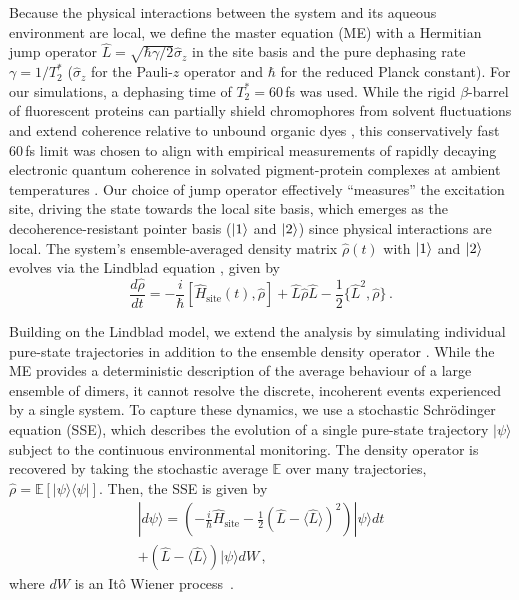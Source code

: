 \documentclass[journal=jpclcd, manuscript=letter, layout=twocolumn, doi=true]{achemso}
\begin{document}
Because the physical interactions between the system and its aqueous environment are local, we define the master equation (ME) with a Hermitian jump operator $\hat{L} = \sqrt{\hbar \gamma / 2} \hat{\sigma}_z$ in the site basis and the pure dephasing rate $\gamma = 1/T_2^*$ ($\hat{\sigma}_z$ for the Pauli-$z$ operator and $\hbar$ for the reduced Planck constant). For our simulations, a dephasing time of $T_2^* = 60$\,fs was used. While the rigid $\beta$-barrel of fluorescent proteins can partially shield chromophores from solvent fluctuations and extend coherence relative to unbound organic dyes \cite{kim2019venusa206}, this conservatively fast $60$\,fs limit was chosen to align with empirical measurements of rapidly decaying electronic quantum coherence in solvated pigment-protein complexes at ambient temperatures \cite{duan2017nature}. Our choice of jump operator effectively ``measures'' the excitation site, driving the state towards the local site basis, which emerges as the decoherence-resistant pointer basis ($\ket{1}$ and $\ket{2}$) since physical interactions are local. The system's ensemble-averaged density matrix $\hat{\rho}(t)$ with $\ket{1}$ and $\ket{2}$ evolves via the Lindblad equation \cite{manzano2020short}, given by
\begin{equation}
    \frac{d\hat{\rho}}{dt}=-\frac{i}{\hbar}[\hat H_{\text{site}}(t),\hat\rho] + \hat{L} \hat\rho \hat{L} - \frac{1}{2} \{\hat{L}^2, \hat\rho\}\,.
    \label{eq:ME01}
\end{equation}

Building on the Lindblad model, we extend the analysis by simulating individual pure-state trajectories in addition to the ensemble density operator \cite{abrahams2025excitonic}. While the ME provides a deterministic description of the average behaviour of a large ensemble of dimers, it cannot resolve the discrete, incoherent events experienced by a single system. To capture these dynamics, we use a stochastic Schrödinger equation (SSE), which describes the evolution of a single pure-state trajectory $|\psi\rangle$ subject to the continuous environmental monitoring. The density operator is recovered by taking the stochastic average $\mathbb{E}$ over many trajectories, $\hat{\rho} = \mathbb{E}[|\psi\rangle\langle\psi|]$. Then, the SSE is given by
\begin{multline}
    |d\psi\rangle = \left( -\frac{i}{\hbar}\hat{H}_{\text{site}} - \frac{1}{2}(\hat{L} - \langle \hat{L} \rangle)^2 \right) |\psi\rangle dt \\
    + (\hat{L} - \langle \hat{L} \rangle) |\psi\rangle dW \, ,
\end{multline}
where $dW$ is an It\^{o} Wiener process~\cite{petruccione}.
\end{document}
